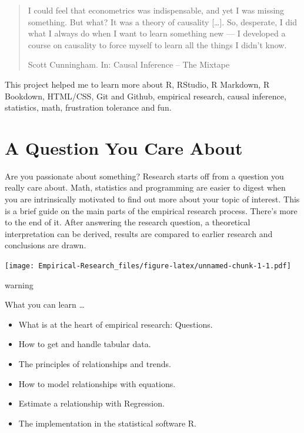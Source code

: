 \documentclass[
]{book}
\providecommand{\tightlist}{%
  \setlength{\itemsep}{0pt}\setlength{\parskip}{0pt}}
\begin{document}
\begin{quote}
I could feel that econometrics was indispensable, and yet I was missing something. But what? It was a theory of causality {[}\ldots{]}. So, desperate, I did what I always do when I want to learn something new --- I developed a course on causality to force myself to learn all the things I didn't know.

\hfill Scott Cunningham. In: Causal Inference -- The Mixtape
\end{quote}

This project helped me to learn more about R, RStudio, R Markdown, R Bookdown, HTML/CSS, Git and Github, empirical research, causal inference, statistics, math, frustration tolerance and fun.

\hypertarget{a-question-you-care-about}{%
\chapter{A Question You Care About}\label{a-question-you-care-about}}

Are you passionate about something? Research starts off from a question you really care about. Math, statistics and programming are easier to digest when you are intrinsically motivated to find out more about your topic of interest. This is a brief guide on the main parts of the empirical research process. There's more to the end of it. After answering the research question, a theoretical interpretation can be derived, results are compared to earlier research and conclusions are drawn.

\texttt{[image: Empirical-Research\_files/figure-latex/unnamed-chunk-1-1.pdf]}

\begin{infobox}warning

What you can learn \ldots{}

\begin{itemize}
\tightlist
\item
  What is at the heart of empirical research: Questions.
\item
  How to get and handle tabular data.
\item
  The principles of relationships and trends.
\item
  How to model relationships with equations.
\item
  Estimate a relationship with Regression.
\item
  The implementation in the statistical software R.
\end{itemize}

\end{infobox}
\end{document}
